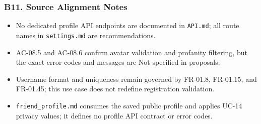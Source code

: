 \documentclass[12pt]{article}
\begin{document}
\subsubsection*{B11. Source Alignment Notes}
\par\medskip

\begin{itemize}
\item No dedicated profile API endpoints are documented in \texttt{API.md}; all route names in \texttt{settings.md} are recommendations.
\item AC-08.5 and AC-08.6 confirm avatar validation and profanity filtering, but the exact error codes and messages are Not specified in proposals.
\item Username format and uniqueness remain governed by FR-01.8, FR-01.15, and FR-01.45; this use case does not redefine registration validation.
\item \texttt{friend\_profile.md} consumes the saved public profile and applies UC-14 privacy values; it defines no profile API contract or error codes.
\end{itemize}
\par\medskip

\par\medskip
\hypertarget{sec:ui-prototype-specimens}{}
\end{document}
